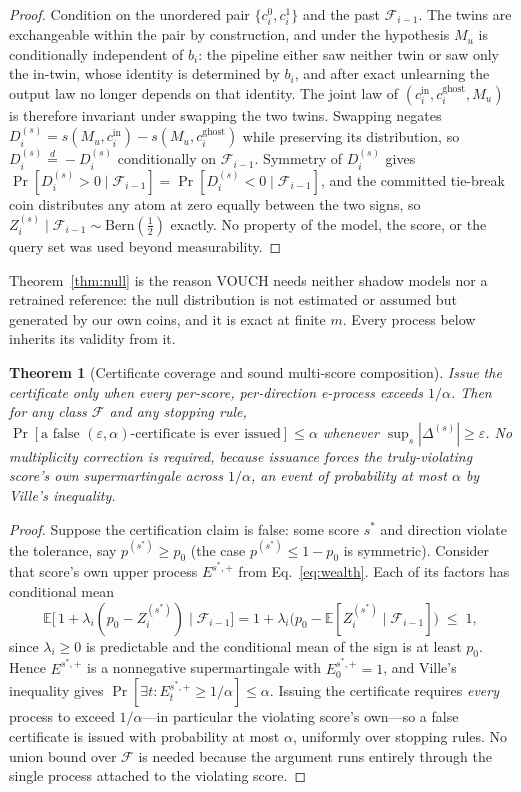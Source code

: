 \documentclass[pdflatex,sn-mathphys-num]{sn-jnl}
\theoremstyle{thmstyleone}
\newtheorem{theorem}{Theorem}
\theoremstyle{thmstyletwo}
\theoremstyle{thmstylethree}
\newcommand{\F}{\mathcal{F}}
\newcommand{\Bern}{\mathrm{Bern}}
\newcommand{\eps}{\varepsilon}
\newcommand{\Efrak}{\mathbb{E}}
\begin{document}
\begin{proof}
Condition on the unordered pair $\{c_i^0, c_i^1\}$ and the past $\F_{i-1}$. The twins
are exchangeable within the pair by construction, and under the hypothesis $M_u$ is
conditionally independent of $b_i$: the pipeline either saw neither twin or saw only
the in-twin, whose identity is determined by $b_i$, and after exact unlearning the
output law no longer depends on that identity. The joint law of
$(c_i^{\text{in}}, c_i^{\text{ghost}}, M_u)$ is therefore invariant under swapping the
two twins. Swapping negates
$D_i^{(s)} = s(M_u, c_i^{\text{in}}) - s(M_u, c_i^{\text{ghost}})$ while preserving its
distribution, so $D_i^{(s)} \overset{d}{=} -D_i^{(s)}$ conditionally on $\F_{i-1}$.
Symmetry of $D_i^{(s)}$ gives $\Pr[D_i^{(s)} > 0 \mid \F_{i-1}] =
\Pr[D_i^{(s)} < 0 \mid \F_{i-1}]$, and the committed tie-break coin distributes any
atom at zero equally between the two signs, so
$Z_i^{(s)} \mid \F_{i-1} \sim \Bern(\tfrac12)$ exactly. No property of the model, the
score, or the query set was used beyond measurability.
\end{proof}

Theorem~\ref{thm:null} is the reason VOUCH needs neither shadow models nor a retrained
reference: the null distribution is not estimated or assumed but generated by our own
coins, and it is exact at finite $m$. Every process below inherits its validity from it.

\begin{theorem}[Certificate coverage and sound multi-score composition]\label{thm:cert}
Issue the certificate only when \emph{every} per-score, per-direction e-process exceeds
$1/\alpha$. Then for any class $\F$ and any stopping rule,
$\Pr[\text{a false }(\eps,\alpha)\text{-certificate is ever issued}] \le \alpha$
whenever $\sup_s |\Delta^{(s)}| \ge \eps$. No multiplicity correction is required,
because issuance forces the truly-violating score's own supermartingale across
$1/\alpha$, an event of probability at most $\alpha$ by Ville's inequality.
\end{theorem}

\begin{proof}
Suppose the certification claim is false: some score $s^\ast$ and direction violate the
tolerance, say $p^{(s^\ast)} \ge p_0$ (the case $p^{(s^\ast)} \le 1 - p_0$ is
symmetric). Consider that score's own upper process $E^{s^\ast,+}$ from
Eq.~\eqref{eq:wealth}. Each of its factors has conditional mean
\[
\Efrak\bigl[\,1 + \lambda_i (p_0 - Z_i^{(s^\ast)}) \mid \F_{i-1}\bigr]
= 1 + \lambda_i \bigl(p_0 - \Efrak[Z_i^{(s^\ast)} \mid \F_{i-1}]\bigr) \;\le\; 1,
\]
since $\lambda_i \ge 0$ is predictable and the conditional mean of the sign is at
least $p_0$. Hence $E^{s^\ast,+}$ is a nonnegative supermartingale with
$E^{s^\ast,+}_0 = 1$, and Ville's inequality gives
$\Pr[\exists t: E_t^{s^\ast,+} \ge 1/\alpha] \le \alpha$. Issuing the certificate
requires \emph{every} process to exceed $1/\alpha$---in particular the violating
score's own---so a false certificate is issued with probability at most $\alpha$,
uniformly over stopping rules. No union bound over $\F$ is needed because the argument
runs entirely through the single process attached to the violating score.
\end{proof}
\end{document}
